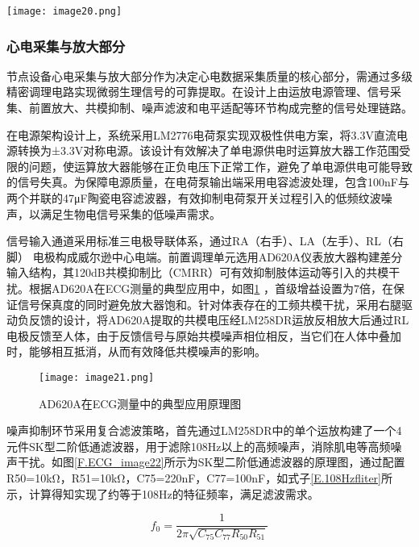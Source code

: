\begin{sidewaysfigure}
    \centering
    \texttt{[image: image20.png]}
    \caption{心电信号采集节点电源部分硬件原理图设计}
    \label{F.ECG_image20}
\end{sidewaysfigure}

\newpage    %

\subsubsection{心电采集与放大部分}

节点设备心电采集与放大部分作为决定心电数据采集质量的核心部分，需通过多级精密调理电路实现微弱生理信号的可靠提取。在设计上由运放电源管理、信号采集、前置放大、共模抑制、噪声滤波和电平适配等环节构成完整的信号处理链路。

在电源架构设计上，系统采用LM2776电荷泵实现双极性供电方案，将3.3V直流电源转换为±3.3V对称电源。该设计有效解决了单电源供电时运算放大器工作范围受限的问题，使运算放大器能够在正负电压下正常工作，避免了单电源供电可能导致的信号失真。为保障电源质量，在电荷泵输出端采用电容滤波处理，包含100nF与两个并联的47μF陶瓷电容滤波器，有效抑制电荷泵开关过程引入的低频纹波噪声，以满足生物电信号采集的低噪声需求。

信号输入通道采用标准三电极导联体系，通过RA（右手）、LA（左手）、RL（右脚） 电极构成威尔逊中心电端。前置调理单元选用AD620A仪表放大器构建差分输入结构，其120dB共模抑制比（CMRR）可有效抑制肢体运动等引入的共模干扰。根据AD620A在ECG测量的典型应用中，如图\ref{F.ECG_image21} \cite{AD620A}，首级增益设置为7倍，在保证信号保真度的同时避免放大器饱和。针对体表存在的工频共模干扰，采用右腿驱动负反馈的设计，将AD620A提取的共模电压经LM258DR运放反相放大后通过RL电极反馈至人体，由于反馈信号与原始共模噪声相位相反，当它们在人体中叠加时，能够相互抵消，从而有效降低共模噪声的影响。

\begin{figure}[H]
    \centering
    \texttt{[image: image21.png]}
    \caption{AD620A在ECG测量中的典型应用原理图}
    \label{F.ECG_image21}
\end{figure}


噪声抑制环节采用复合滤波策略，首先通过LM258DR中的单个运放构建了一个4元件SK型二阶低通滤波器，用于滤除108Hz以上的高频噪声，消除肌电等高频噪声干扰。如图\ref{F.ECG_image22}所示为SK型二阶低通滤波器的原理图，通过配置R50=10kΩ，R51=10kΩ，C75=220nF，C77=100nF，如式子\ref{E.108Hzfliter}所示，计算得知实现了约等于108Hz的特征频率，满足滤波需求。

\begin{equation}
    f_{0}=\frac{1}{2 \pi \sqrt{C_{75} C_{77} R_{50} R_{51}}}
\label{E.108Hzfliter}
\end{equation}

